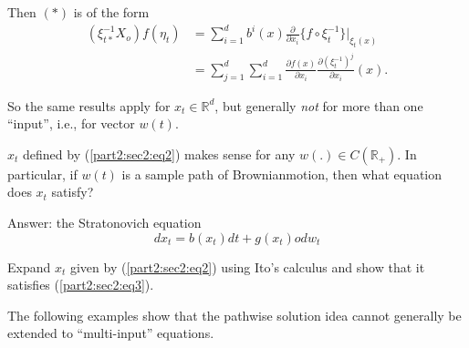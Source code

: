 Then $(*)$ is of the form
\begin{align*}
  (\xi ^{-1}_{t*} X_o)f(\eta_{t})&= \sum_{i=1}^{d} b^i (x)
  \frac{\partial}{\partial x_i} \{f \circ \xi^{-1}_{t}\}|_{\xi_{t}(x)}\\ 
  &=\sum_{j=1}^d \sum_{i=1}^{d} \frac{\partial f(x)}{ \partial x_i}
  \frac{\partial (\xi ^{-1}_{t})^j}{\partial x_i}(x). 
\end{align*}

So the same results apply for $x_t \in  \mathbb{R}^d$, but
generally \textit{not} for more than one ``input'', i.e., for vector
$w(t)$.  

\medskip
{}
$x_t$ defined by (\ref{part2:sec2:eq2}) makes sense for any $w(. ) \in  C (
\mathbb{R}_{+})$. In particular, if $w(t)$ is a sample path of
Brownian\pageoriginale motion, then what equation does $x_t$ satisfy?  

\noindent 
Answer: the Stratonovich equation
\begin{equation*}
  dx_t= b(x_t)dt + g(x_t) o dw_t \tag{3}\label{part2:sec2:eq3}
\end{equation*}


\begin{exercise} %
  Expand $x_t$ given by (\ref{part2:sec2:eq2}) using Ito's calculus
  and show that it   satisfies (\ref{part2:sec2:eq3}).  

  The following examples show that the pathwise solution idea cannot
  generally be extended to ``multi-input'' equations.  
\end{exercise}

